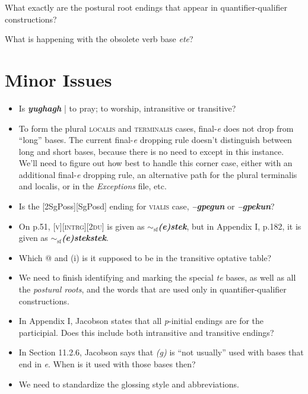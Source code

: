 \documentclass{article}
\begin{document}
\item What exactly are the postural root endings that appear in quantifier-qualifier constructions?

\item What is happening with the obsolete verb base \textit{ete}?




\section{Minor Issues}

\begin{itemize}
\renewcommand\labelitemi{$\cdot$}

\item Is \textit{\textbf{yughagh}} | to pray; to worship, intransitive or transitive?

\item To form the plural \textsc{localis} and \textsc{terminalis} cases, final-\textit{e} does not drop from ``long'' bases.
%
The current final-\textit{e} dropping rule doesn't distinguish between long and short bases, because there is no need to except in this instance.
%
We'll need to figure out how best to handle this corner case, either with an additional final-\textit{e} dropping rule, an alternative path for the plural terminalis and localis, or in the \textit{Exceptions} file, etc.

\item Is the [2SgPoss][SgPosd] ending for \textsc{vialis} case, \textit{\textbf{--gpegun}} or \textit{\textbf{--gpekun}}?

\item On p.51, \textsc{[v][intrg][2du]} is given as \textit{\textbf{$\sim_\text{sf}$(e)stek}}, but in Appendix I, p.182, it is given as \textit{\textbf{$\sim_\text{sf}$(e)stekstek}}.

\item Which @ and (i) is it supposed to be in the transitive optative table?

\item We need to finish identifying and marking the special \textit{te} bases, as well as all the \textit{postural roots}, and the words that are used only in quantifier-qualifier constructions.

\item In Appendix I, Jacobson states that all \textit{p}-initial endings are for the participial.
%
Does this include both intransitive and transitive endings?

\item In Section 11.2.6, Jacobson says that \textit{(g)} is ``not usually'' used with bases that end in \textit{e}.
%
When is it used with those bases then?

\item We need to standardize the glossing style and abbreviations.

\end{itemize}
\end{document}
